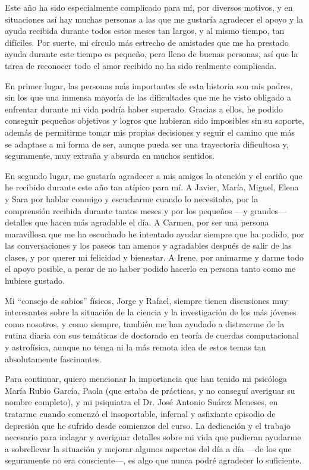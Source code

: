 Este año ha sido especialmente complicado para mí, por diversos motivos, y en situaciones así hay muchas personas a las que me gustaría agradecer el apoyo y la ayuda recibida durante todos estos meses tan largos, y al mismo tiempo, tan difíciles. Por suerte, mi círculo más estrecho de amistades que me ha prestado ayuda durante este tiempo es pequeño, pero lleno de buenas personas, así que la tarea de reconocer todo el amor recibido no ha sido realmente complicada. 

En primer lugar, las personas más importantes de esta historia son mis padres, sin los que una inmensa mayoría de las dificultades que me he visto obligado a enfrentar durante mi vida podría haber superado. Gracias a ellos, he podido conseguir pequeños objetivos y logros que hubieran sido imposibles sin su soporte, además de permitirme tomar mis propias decisiones y seguir el camino que más se adaptase a mi forma de ser, aunque pueda ser una trayectoria dificultosa y, seguramente, muy extraña y absurda en muchos sentidos.

En segundo lugar, me gustaría agradecer a mis amigos la atención y el cariño que he recibido durante este año tan atípico para mí. A Javier, María, Miguel, Elena y Sara por hablar conmigo y escucharme cuando lo necesitaba, por la comprensión recibida durante tantos meses y por los pequeños ---y grandes--- detalles que hacen más agradable el día. A Carmen, por ser una persona maravillosa que me ha escuchado he intentado ayudar siempre que ha podido, por las conversaciones y los paseos tan amenos y agradables después de salir de las clases, y por querer mi felicidad y bienestar. A Irene, por animarme y darme todo el apoyo posible, a pesar de no haber podido hacerlo en persona tanto como me hubiese gustado.

Mi \enquote{consejo de sabios} físicos, Jorge y Rafael, siempre tienen discusiones muy interesantes sobre la situación de la ciencia y la investigación de los más jóvenes como nosotros, y como siempre, también me han ayudado a distraerme de la rutina diaria con sus temáticas de doctorado en teoría de cuerdas computacional y astrofísica, aunque no tenga ni la más remota idea de estos temas tan absolutamente fascinantes. 

Para continuar, quiero mencionar la importancia que han tenido mi psicóloga María Rubio García, Paola (que estaba de prácticas, y no conseguí averiguar su nombre completo), y mi psiquiatra el Dr. José Antonio Suárez Meneses, en tratarme cuando comenzó el insoportable, infernal y asfixiante episodio de depresión que he sufrido desde comienzos del curso. La dedicación y el trabajo necesario para indagar y averiguar detalles sobre mi vida que pudieran ayudarme a sobrellevar la situación y mejorar algunos aspectos del día a día ---de los que seguramente no era consciente---, es algo que nunca podré agradecer lo suficiente.

